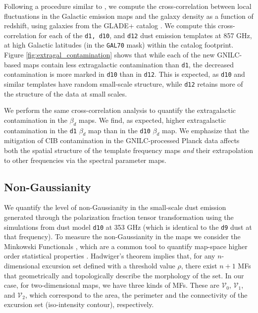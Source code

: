 \documentclass[twocolumn]{aastex631}
\begin{document}
Following a procedure similar to \citet{Chiang:2019}, we compute the cross-correlation between local fluctuations in the Galactic emission maps and the galaxy density as a function of redshift, using galaxies from the GLADE+ catalog \citep{Dalya:2022}. We compute this cross-correlation for each of the \texttt{d1, d10}, and \texttt{d12} dust emission templates at 857 GHz, at high Galactic latitudes (in the \texttt{GAL70} mask) within the catalog footprint. Figure \ref{fig:extragal_contamination} shows that while each of the new GNILC-based maps contain less extragalactic contamination than \texttt{d1}, the decreased contamination is more marked in \texttt{d10} than in \texttt{d12}. This is expected, as \texttt{d10} and similar templates have random small-scale structure, while \texttt{d12} retains more of the structure of the data at small scales. 

We perform the same cross-correlation analysis to quantify the extragalactic contamination in the $\beta_d$ maps. We find, as expected, higher extragalactic contamination in the \texttt{d1} $\beta_d$ map than in the \texttt{d10} $\beta_d$ map. We emphasize that the mitigation of CIB contamination in the GNILC-processed Planck data affects both the spatial structure of the template frequency maps \textit{and} their extrapolation to other frequencies via the spectral parameter maps. 

\subsection{Non-Gaussianity} \label{sec:nongaussianity}

We quantify the level of non-Gaussianity in the small-scale dust emission generated through the polarization fraction tensor transformation using the simulations from dust model \texttt{d10} at 353 GHz (which is identical to the \texttt{d9} dust at that frequency). To measure the non-Gaussianity in the maps we consider the Minkowski Functionals \citep[MFs,][]{Minkowski1903}, which are a common tool to quantify map-space higher order statistical properties \citep{Martire:2023, Carones:2024}. 
Hadwiger’s theorem \citep{hadwigerVorlesungenUeberInhalt1957}
implies that, for any $n$-dimensional excursion set defined with a threshold value $\rho$, there exist $n+1$ MFs that geometrically and topologically describe the morphology of the set. In our case, for two-dimensional maps, we have three kinds of MFs. These are $\mathcal{V}_0$, $\mathcal{V}_1$, and $\mathcal{V}_2$, which correspond to the area, the perimeter and the connectivity of the excursion set (iso-intensity contour), respectively.
\end{document}
